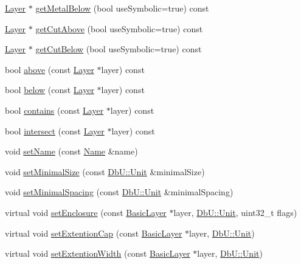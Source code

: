 \begin{DoxyCompactItemize}
\item 
\hyperlink{classHurricane_1_1Layer}{Layer} $\ast$ \hyperlink{classHurricane_1_1Layer_a75ad3256fdd57cd42352f77f9e31a247}{get\-Metal\-Below} (bool use\-Symbolic=true) const 
\item 
\hyperlink{classHurricane_1_1Layer}{Layer} $\ast$ \hyperlink{classHurricane_1_1Layer_aa3cb7d4216eb51266dfd3b4d2571aab3}{get\-Cut\-Above} (bool use\-Symbolic=true) const 
\item 
\hyperlink{classHurricane_1_1Layer}{Layer} $\ast$ \hyperlink{classHurricane_1_1Layer_a63be7b3c5a49205bafb3b91dcbb111a2}{get\-Cut\-Below} (bool use\-Symbolic=true) const 
\item 
bool \hyperlink{classHurricane_1_1Layer_ab9149df5e349afc444f29c89b1bbf7c0}{above} (const \hyperlink{classHurricane_1_1Layer}{Layer} $\ast$layer) const 
\item 
bool \hyperlink{classHurricane_1_1Layer_ac72df9b31fe334b66623ebb61c8a77e7}{below} (const \hyperlink{classHurricane_1_1Layer}{Layer} $\ast$layer) const 
\item 
bool \hyperlink{classHurricane_1_1Layer_a962c98d22d346e937dfc6a68ccd2546b}{contains} (const \hyperlink{classHurricane_1_1Layer}{Layer} $\ast$layer) const 
\item 
bool \hyperlink{classHurricane_1_1Layer_aad0b304e9af65f2c364c4b05fa5d0d26}{intersect} (const \hyperlink{classHurricane_1_1Layer}{Layer} $\ast$layer) const 
\item 
void \hyperlink{classHurricane_1_1Layer_ab93809f19bc360f58d35e91438ef2f87}{set\-Name} (const \hyperlink{classHurricane_1_1Name}{Name} \&name)
\item 
void \hyperlink{classHurricane_1_1Layer_a400d17fe999c0080bb50489948986fe7}{set\-Minimal\-Size} (const \hyperlink{group__DbUGroup_ga4fbfa3e8c89347af76c9628ea06c4146}{Db\-U\-::\-Unit} \&minimal\-Size)
\item 
void \hyperlink{classHurricane_1_1Layer_a81a8a24526e8535fba5a35cdcc194a8f}{set\-Minimal\-Spacing} (const \hyperlink{group__DbUGroup_ga4fbfa3e8c89347af76c9628ea06c4146}{Db\-U\-::\-Unit} \&minimal\-Spacing)
\item 
virtual void \hyperlink{classHurricane_1_1Layer_a04e9c983525d074508d7e10107c1c3c7}{set\-Enclosure} (const \hyperlink{classHurricane_1_1BasicLayer}{Basic\-Layer} $\ast$layer, \hyperlink{group__DbUGroup_ga4fbfa3e8c89347af76c9628ea06c4146}{Db\-U\-::\-Unit}, uint32\-\_\-t flags)
\item 
virtual void \hyperlink{classHurricane_1_1Layer_a55c7b39e000442ea36a0774d26b7fbde}{set\-Extention\-Cap} (const \hyperlink{classHurricane_1_1BasicLayer}{Basic\-Layer} $\ast$layer, \hyperlink{group__DbUGroup_ga4fbfa3e8c89347af76c9628ea06c4146}{Db\-U\-::\-Unit})
\item 
virtual void \hyperlink{classHurricane_1_1Layer_a7a6943dbcb3403aff34056cd5de00e66}{set\-Extention\-Width} (const \hyperlink{classHurricane_1_1BasicLayer}{Basic\-Layer} $\ast$layer, \hyperlink{group__DbUGroup_ga4fbfa3e8c89347af76c9628ea06c4146}{Db\-U\-::\-Unit})
\end{DoxyCompactItemize}


